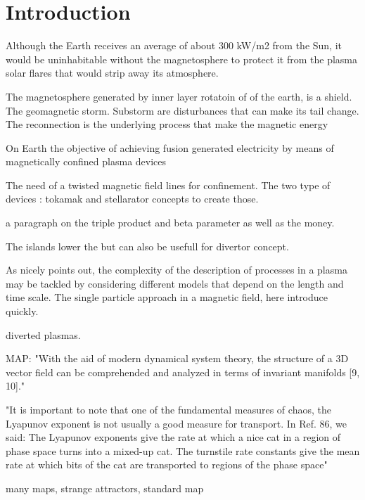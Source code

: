 
\cleardoublepage
\chapter*{Introduction}

Although the Earth receives an average of about 300 kW/m2 from the Sun, it would be uninhabitable without the magnetosphere to protect it from the plasma solar flares that would strip away its atmosphere. 

The magnetosphere generated by inner layer rotatoin of of the earth, is a shield. The geomagnetic storm. Substorm are disturbances that can make its tail change. The reconnection is the underlying process that make the magnetic energy 

On Earth the objective of achieving fusion generated electricity by means of magnetically confined plasma devices 

The need of a twisted magnetic field lines for confinement. The two type of devices : tokamak and stellarator concepts to create those.

a paragraph on the triple product and beta parameter as well as the money.

The islands lower the but can also be usefull for divertor concept.

As \cite{imbert-gerard_introduction_2020} nicely points out, the complexity of the description of processes in a plasma may be tackled by considering different models that depend on the length and time scale. The single particle approach in a magnetic field, here introduce quickly.

diverted plasmas.

MAP: "With the aid of modern dynamical system theory, the structure of a 3D vector field can be comprehended and analyzed in terms of invariant manifolds [9, 10]."

"It is important to note that one of the fundamental measures of chaos, the Lyapunov exponent is not usually a good measure for transport. In Ref. 86, we said: The Lyapunov exponents give the rate at which a nice cat in a region of phase space turns into a mixed-up cat. The turnstile rate constants give the mean rate at which bits of the cat are transported to regions of the phase space"

many maps, strange attractors, standard map

